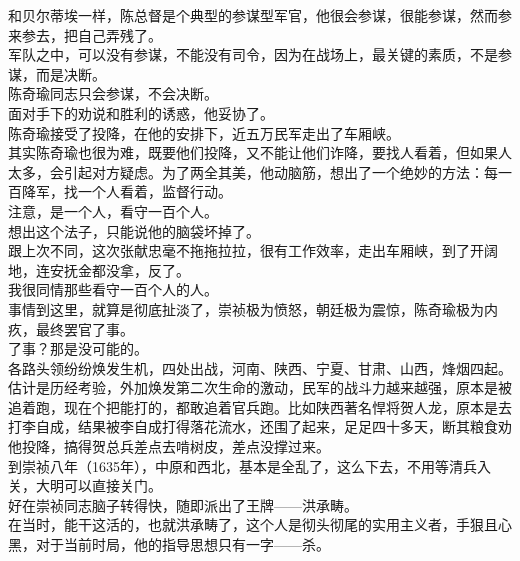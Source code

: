 \begin{multicols}{\theparacolNo}
和贝尔蒂埃一样，陈总督是个典型的参谋型军官，他很会参谋，很能参谋，然而参来参去，把自己弄残了。\\

军队之中，可以没有参谋，不能没有司令，因为在战场上，最关键的素质，不是参谋，而是决断。\\

陈奇瑜同志只会参谋，不会决断。\\

面对手下的劝说和胜利的诱惑，他妥协了。\\

陈奇瑜接受了投降，在他的安排下，近五万民军走出了车厢峡。\\

其实陈奇瑜也很为难，既要他们投降，又不能让他们诈降，要找人看着，但如果人太多，会引起对方疑虑。为了两全其美，他动脑筋，想出了一个绝妙的方法：每一百降军，找一个人看着，监督行动。\\

注意，是一个人，看守一百个人。\\

想出这个法子，只能说他的脑袋坏掉了。\\

跟上次不同，这次张献忠毫不拖拖拉拉，很有工作效率，走出车厢峡，到了开阔地，连安抚金都没拿，反了。\\

我很同情那些看守一百个人的人。\\

事情到这里，就算是彻底扯淡了，崇祯极为愤怒，朝廷极为震惊，陈奇瑜极为内疚，最终罢官了事。\\

了事？那是没可能的。\\

各路头领纷纷焕发生机，四处出战，河南、陕西、宁夏、甘肃、山西，烽烟四起。\\

估计是历经考验，外加焕发第二次生命的激动，民军的战斗力越来越强，原本是被追着跑，现在个把能打的，都敢追着官兵跑。比如陕西著名悍将贺人龙，原本是去打李自成，结果被李自成打得落花流水，还围了起来，足足四十多天，断其粮食劝他投降，搞得贺总兵差点去啃树皮，差点没撑过来。\\

到崇祯八年（1635年），中原和西北，基本是全乱了，这么下去，不用等清兵入关，大明可以直接关门。\\

好在崇祯同志脑子转得快，随即派出了王牌——洪承畴。\\

在当时，能干这活的，也就洪承畴了，这个人是彻头彻尾的实用主义者，手狠且心黑，对于当前时局，他的指导思想只有一字——杀。\\


\end{multicols}
